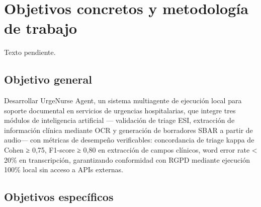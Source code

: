 \section{Objetivos concretos y metodología de trabajo}
Texto pendiente.

\subsection{Objetivo general}

Desarrollar UrgeNurse Agent, un sistema multiagente de ejecución local para soporte documental en servicios de urgencias hospitalarias, que integre tres módulos de inteligencia artificial — validación de triage ESI, extracción de información clínica mediante OCR y generación de borradores SBAR a partir de audio— con métricas de desempeño verificables: concordancia de triage kappa de Cohen ≥ 0,75, F1-score ≥ 0,80 en extracción de campos clínicos, word error rate < 20\% en transcripción, garantizando conformidad con RGPD mediante ejecución 100\% local sin acceso a APIs externas.

\subsection{Objetivos específicos}

